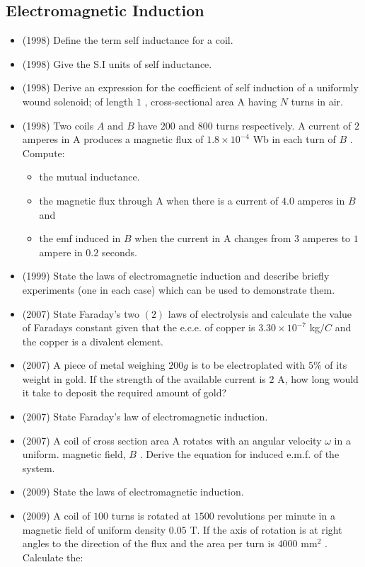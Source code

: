 \documentclass{article}
\begin{document}
\subsection{Electromagnetic Induction}
\begin{itemize}
\item (1998)  Define the term self inductance for a coil.
\item (1998)  Give the S.I units of self inductance.
\item (1998)  Derive an expression for the coefficient of self induction of a uniformly wound solenoid; of length $ 1$ , cross-sectional area A having $ N$ turns in air.
\item (1998)  Two coils $ A$ and $ B$ have $ 200$ and $ 800$ turns respectively. A current of $ 2$ amperes in A produces a magnetic flux of $ 1.8 \times 10^{-4}$ Wb in each turn of $ B$ . Compute:\begin{itemize}
\item the mutual inductance.
\item the magnetic flux through A when there is a current of $ 4.0$ amperes in $ B$ and
\item the emf induced in $ B$ when the current in A changes from $ 3$ amperes to $ 1$ ampere in $ 0.2$ seconds.
\end{itemize}
\item (1999)  State the laws of electromagnetic induction and describe briefly experiments (one in each case) which can be used to demonstrate them.
\item (2007)  State Faraday’s two $ (2)$ laws of electrolysis and calculate the value of Faradays constant given that the e.c.e. of copper is $ 3.30 \times 10^{-7}$ kg$/C$ and the copper is a divalent element. 
\item (2007)  A piece of metal weighing $ 200g$ is to be electroplated with $ 5\%$ of its weight in gold. If the strength of the available current is $ 2$ A, how long would it take to deposit the required amount of gold?
\item (2007)  State Faraday’s law of electromagnetic induction. 
\item (2007)  A coil of cross section area A rotates with an angular velocity $ \omega $ in a uniform. magnetic field, $ B$ . Derive the equation for induced e.m.f. of the system.
\item (2009)  State the laws of electromagnetic induction.
\item (2009)  A coil of $ 100$ turns is rotated at $ 1500$ revolutions per minute in a magnetic field of uniform density $ 0.05$ T.  If the axis of rotation is at right angles to the direction of the flux and the area per turn is $ 4000 $ mm$ ^{2}$ .  Calculate the:\begin{itemize}

\end{itemize}
\end{itemize}
\end{document}
